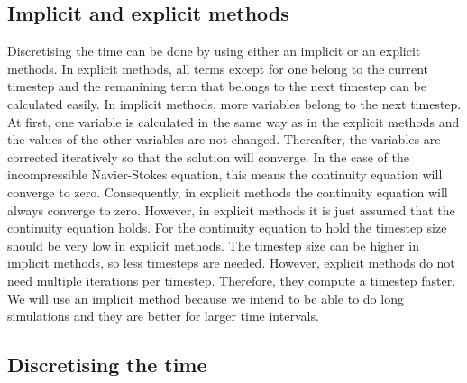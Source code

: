 \documentclass{article}
\begin{document}
\subsection{Implicit and explicit methods} \label{implicit and explicit}
Discretising the time can be done by using either an implicit or an explicit methods.\cite{enterfea} In explicit methods, all terms except for one belong to the current timestep and the remanining term that belongs to the next timestep can be calculated easily. \cite{enterfea}In implicit methods, more variables belong to the next timestep. At first, one variable is calculated in the same way as in the explicit methods and the values of the other variables are not changed. \cite{enterfea} Thereafter, the variables  are corrected iteratively so that the solution will converge. \cite{enterfea} In the case of the incompressible Navier-Stokes equation, this means the continuity equation will converge to zero. Consequently, in explicit methods the continuity equation will always converge to zero. However, in explicit methods it is just assumed that the continuity equation holds. For the continuity equation to hold the timestep size should be very low in explicit methods. \cite{enterfea} The timestep size can be higher in implicit methods, so less timesteps are needed. \cite{enterfea} However, explicit methods do not need multiple iterations per timestep. Therefore, they compute a timestep faster. \cite{enterfea}We will use an implicit method because we intend to be able to do long simulations and they are better for larger time intervals.\cite{enterfea}


\subsection{Discretising the time}
\end{document}
